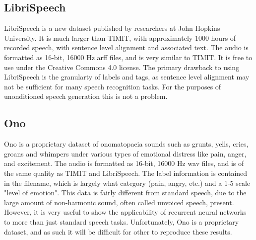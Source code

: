 \documentclass{article} %
\begin{document}
\subsection{LibriSpeech}
LibriSpeech is a new dataset published by researchers at
John Hopkins University. It is much larger than TIMIT, with approximately
1000 hours of recorded speech, with sentence level alignment and associated
text. The audio is formatted as 16-bit, 16000 Hz arff files, and is very
similar to TIMIT. It is free to use under the Creative Commons 4.0 license.
The primary drawback to using LibriSpeech is the granularty of labels and
tags, as sentence level alignment may not be sufficient for many speech
recognition tasks. For the purposes of unonditioned speech generation
this is not a problem.
\subsection{Ono}
Ono is a proprietary dataset of onomatopaeia sounds such as grunts,
yells, cries, groans and whimpers under various types of emotional
distress like pain, anger, and excitement. The audio is formatted as 16-bit,
16000 Hz wav files, and is of the same quality as TIMIT and LibriSpeech.
The label information is contained in the filename, which is largely what
category (pain, angry, etc.) and a 1-5 scale "level of emotion".
This data is fairly different from standard speech, due to the large amount
of non-harmonic sound, often called unvoiced speech, present. However, it
is very useful to show the applicability of recurrent neural networks to more
than just standard speech tasks. Unfortunately, Ono is a proprietary
dataset, and as such it will be difficult for other to reproduce these results.
\end{document}

